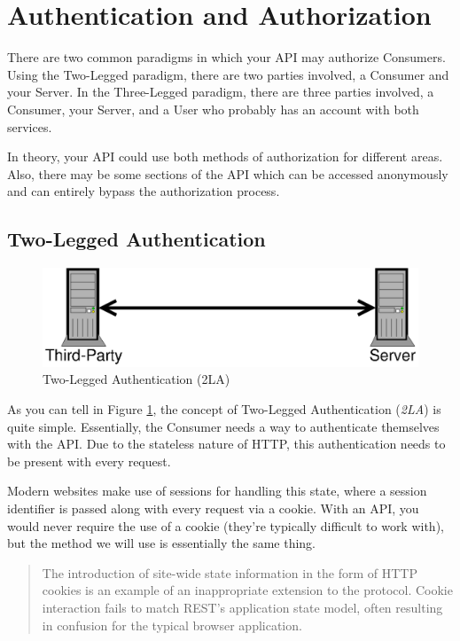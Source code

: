 \documentclass{book}
\begin{document}
\section{Authentication and Authorization}

There are two common paradigms in which your API may authorize Consumers. Using the Two-Legged paradigm, there are two parties involved, a Consumer and your Server. In the Three-Legged paradigm, there are three parties involved, a Consumer, your Server, and a User who probably has an account with both services.

In theory, your API could use both methods of authorization for different areas. Also, there may be some sections of the API which can be accessed anonymously and can entirely bypass the authorization process.

\subsection{Two-Legged Authentication}

\begin{figure}[!htb]
\centering
\includegraphics[scale=.6]{images/two-legged.eps}
\caption{Two-Legged Authentication (2LA)}
\label{fig:twolegged}
\end{figure}

As you can tell in Figure \ref{fig:twolegged}, the concept of Two-Legged Authentication (\emph{2LA}) is quite simple. Essentially, the Consumer needs a way to authenticate themselves with the API. Due to the stateless nature of HTTP, this authentication needs to be present with every request.

Modern websites make use of sessions for handling this state, where a session identifier is passed along with every request via a cookie. With an API, you would never require the use of a cookie (they're typically difficult to work with), but the method we will use is essentially the same thing.

\begin{quote}
The introduction of site-wide state information in the form of HTTP cookies is an example of an inappropriate extension to the protocol. Cookie interaction fails to match REST’s application state model, often resulting in confusion for the typical browser application.\cite[Page 145]{ACMV2N2}
\end{quote}
\end{document}
